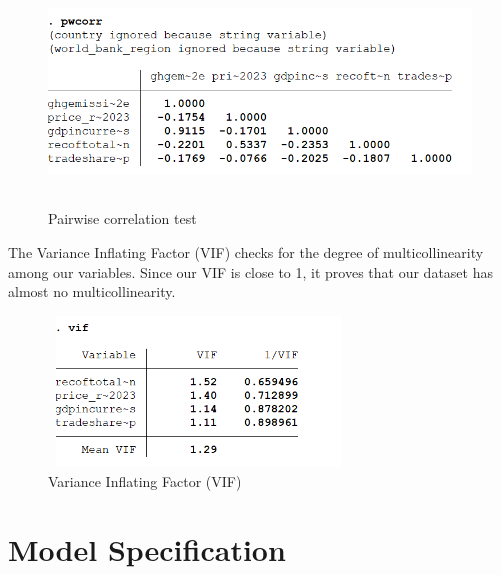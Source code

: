 \documentclass[12pt]{article}
\begin{document}
\begin{figure}[H]
    \centering
    \includegraphics[width=12cm,height=6cm]{ANOVA/1.png} 
    \caption{Pairwise correlation test}
\end{figure}

The Variance Inflating Factor (VIF) checks for the degree of multicollinearity among our variables. Since our VIF is close to 1, it proves that our dataset has almost no multicollinearity.
\begin{figure}[H]
    \centering
    \includegraphics[width=8cm,height=4cm]{ANOVA/2.png} 
    \caption{Variance Inflating Factor (VIF)}
\end{figure}


\section{Model Specification}
\end{document}
